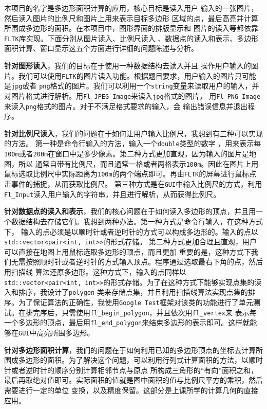 本项目的名字是多边形面积计算的应用，核心目标是读入用户
输入的一张图片，然后读入图片的比例尺和图片上用来表示目标多边形
区域的点，最后高亮并计算所围成多边形的面积。在本项目中，图形界面的排版显示和
图片的读入等都依靠\texttt{FLTK}库实现。下面分别从图片读入、比例尺读入
、数据点的读入和表示、多边形面积计算、窗口显示这五个方面进行详细的问题陈述与分析。

\textbf{针对图形读入}，我们的目标在于使用一种数据结构去读入并且
操作用户输入的图片。我们可以使用\texttt{FLTK}的图片读入功能。根据题目要求，用户输入的图片只可能是\texttt{jpg}或者
\texttt{png}格式的图片。我们可以利用一个\texttt{string}变量来读取用户的输入，并对图片格式进行解析。用\texttt{Fl_JPEG_Image}来读入\texttt{jpg}格式的图片，
用\texttt{Fl_PNG_Image}来读入\texttt{png}格式的图片。对于不满足格式要求的输入，会
输出错误信息并退出程序。

\textbf{针对比例尺读入}，我们的问题在于如何让用户输入比例尺，我想到有三种可以实现的方法。
第一种是命令行输入的方法，输入一个\texttt{double}类型的数字
，用来表示每\texttt{100m}或者\texttt{200m}在窗口中是多少像素。第二种方式更加直观，因为输入的图片是地图，所以
通常自带有比例尺，而且通常一格或者两格表示\texttt{100m}。因此在图片上用鼠标选取比例尺中实际距离为\texttt{100m}的两个端点即可。再由\texttt{FLTK}的屏幕进行鼠标点击事件的捕捉，从而获取比例尺。
第三种方式是在\texttt{GUI}中输入比例尺的方式，利用\texttt{Fl_Input}读入用户输入的字符串，并且进行解析，从而获得比例尺。

\textbf{针对数据点的读入和表示}，我们的核心问题在于如何读入多边形的顶点，并且用一个数据结构去存储它们。我想到两种办法。第一种方式是命令行输入，在这种方式下，
输入的点必须是以顺时针或者逆时针的方式可以构成多边形的。输入的点以\texttt{std::vector<pair<int, int>>}的形式存储。
第二种方式更加合理且直观，用户可以直接在地图上用鼠标选取多边形的顶点，而且更加
重要的是，这种方式下我们无需按照顺时针或者逆时针的方式输入顶点。程序通过选取最右下角的点，然后用扫描线
算法还原多边形。这种方式下，输入的点同样以\texttt{std::vector<pair<int, int>>}的形式存储。为了在这种方式下能够实现点集的读入和排序，我设计了\texttt{polygon}
类来存储点集，并且利用扫描线算法实现点集的排序。为了保证算法的正确性，我使用\texttt{Google Test}框架对该类的功能进行了单元测试。在排完序后，只需使用\texttt{fl_begin_polygon}，并且依次用\texttt{fl_vertex}来
表示每一个多边形的顶点，最后用\texttt{fl_end_polygon}来结束多边形的表示即可。这样就能够在\texttt{GUI}中高亮所围多边形。

\textbf{针对多边形面积计算}，我们的问题在于如何利用已知的多边形顶点的坐标去计算所围成多边形的面积。为了解决这个问题，可以利用行列式计算面积的方法，以顺时针或者逆时针的顺序分别计算相邻节点与原点
所构成三角形的“有向”面积之和，最后再取绝对值即可。实际面积的值就是图中面积的值与比例尺平方的乘积，然后需要进行一定的单位
变换，以及精度保留。这部分是上课所学的计算几何的直接应用。

